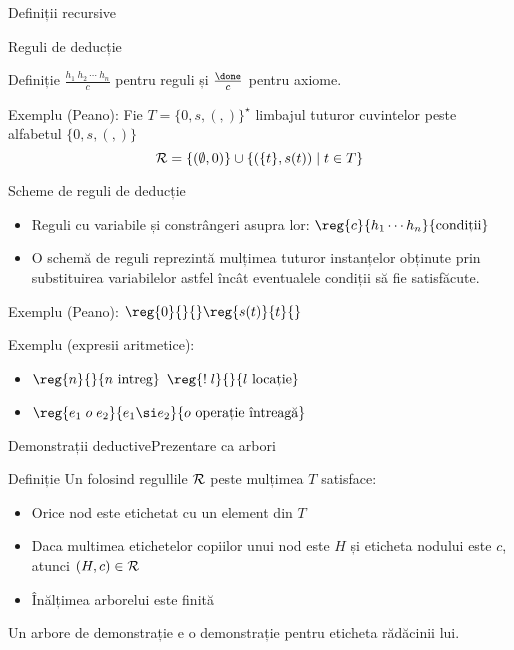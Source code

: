\begin{section}{Definiții recursive}
\begin{frame}{Reguli de deducție}
\begin{block}{Definiție}
          $\frac{h_1\ h_2\ \cdots\ h_n}{c}$ pentru reguli și $\frac{\done}{c}$ pentru axiome.
   \end{block}
   \begin{block}{Exemplu (Peano):}
      Fie $T = \{0,s,(,)\}^\star$ limbajul tuturor cuvintelor peste alfabetul $\{0, s,(,)\}$
      \[{\cal R} = \{ (\emptyset, 0) \} \cup \{ (\{t\}, s ( t ) ) \mid t \in T\}\]
    \end{block}
\end{frame}

\begin{frame}{Scheme de reguli de deducție}
\begin{itemize}
 \item
   Reguli cu variabile și constrângeri asupra lor: 
$\displaystyle\reg{c}{h_1 \cdots h_n}{\mbox{condiții}}$
\item O schemă de reguli reprezintă mulțimea tuturor instanțelor obținute prin substituirea variabilelor astfel încât eventualele condiții să fie satisfăcute.
\end{itemize}
   \begin{block}{Exemplu (Peano):}
 $\displaystyle\hfill \reg{0}{}{} \hfill \reg{s(t)}{t}{}\hfill\ $
\end{block}
   \begin{block}{Exemplu (expresii aritmetice):} 
\begin{itemize}
\item[]
               \hfill $\displaystyle\reg{n}{}{n \mbox{ intreg}}$  \hfill $\displaystyle\reg{\mathrel{!} l}{}{l\mbox{ locație}}$\hfill\ 
  

\item[]               \hfill $\displaystyle\reg{e_1\mathrel{o} e_2}{e_1\si  e_2}{o \mbox{ operație întreagă}}$\hfill\;
\end{itemize}
       \end{block}
\end{frame}

\begin{frame}{Demonstrații deductive}{Prezentare ca arbori}
   \begin{block}{Definiție}
       Un  folosind regullile $\cal R$ peste mulțimea $T$ satisface:
     \begin{itemize} 
         \item Orice nod este etichetat cu un element din $T$
        \item Daca multimea etichetelor copiilor unui nod este $H$ și eticheta nodului este $c$, atunci $(H,c) \in \cal R$
         \item Înălțimea arborelui este finită
      \end{itemize}
    Un arbore de demonstrație e o demonstrație pentru eticheta rădăcinii lui.
    \end{block}


\end{frame}
\end{section}
